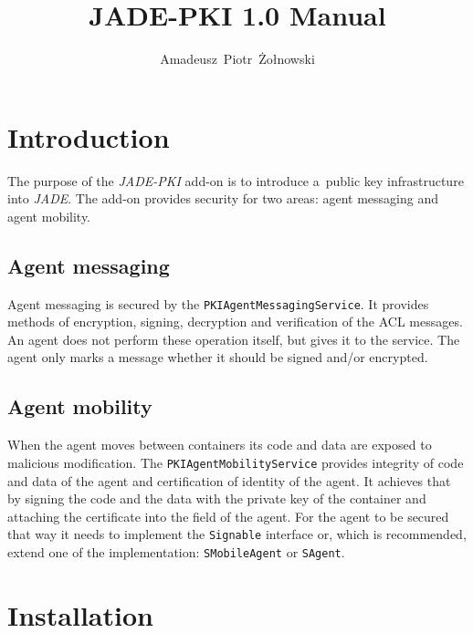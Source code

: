 \documentclass[a4paper,11pt]{article}
\author{Amadeusz~Piotr~Żołnowski}
\title{JADE-PKI 1.0 Manual}
\begin{document}
\maketitle
\tableofcontents

\section{Introduction}

The purpose of the \textit{JADE-PKI} add-on is to introduce a~public key
infrastructure into \textit{JADE}.  The add-on provides security for two
areas: agent messaging and agent mobility.

\subsection{Agent messaging}

Agent messaging is secured by the \texttt{PKI\-Agent\-Messaging\-Ser\-vice}.
It provides methods of encryption, signing, decryption and verification of the
ACL messages.  An agent does not perform these operation itself, but gives it
to the service.  The agent only marks a message whether it should be signed
and/or encrypted.

\subsection{Agent mobility}

When the agent moves between containers its code and data are exposed to
malicious modification.  The \texttt{PKI\-Agent\-Mo\-bi\-li\-ty\-Ser\-vice}
provides integrity of code and data of the agent and certification of identity
of the agent.  It achieves that by signing the code and the data with the
private key of the container and attaching the certificate into the field of
the agent.  For the agent to be secured that way it needs to implement the
\texttt{Signable} interface or, which is recommended, extend one of the
implementation: \texttt{SMo\-bile\-Agent} or \texttt{SAgent}.

\section{Installation}
\end{document}
